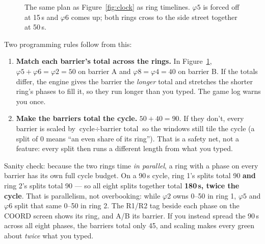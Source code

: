 \documentclass[11pt]{article}
\newcommand{\ph}[1]{\ensuremath{\varphi#1}}
\begin{document}
\begin{figure}[H]
\centering
{}
\caption{The same plan as Figure~\ref{fig:clock} as ring timelines. \ph{5} is
forced off at 15\,s and \ph{6} comes up; both rings cross to the side street
together at 50\,s.}
\label{fig:ringsplit}
\end{figure}

Two programming rules follow from this:

\begin{enumerate}[nosep]
  \item \textbf{Match each barrier's total across the rings.} In
        Figure~\ref{fig:ringsplit}, $\ph{5}+\ph{6} = \ph{2} = 50$ on barrier A
        and $\ph{8} = \ph{4} = 40$ on barrier B. If the totals differ, the engine
        gives the barrier the \emph{longer} total and stretches the shorter
        ring's phases to fill it, so they run longer than you typed. The game
        log warns you once.
  \item \textbf{Make the barriers total the cycle.} $50 + 40 = 90$. If they
        don't, every barrier is scaled by
        $\text{cycle} \div \text{barrier total}$ so the windows still tile the
        cycle (a split of 0 means ``an even share of its ring''). That is a
        safety net, not a feature: every split then runs a different length
        from what you typed.
\end{enumerate}

\begin{tipbox}
Sanity check: because the two rings time \emph{in parallel}, a ring with a phase
on every barrier has its own full cycle budget. On a 90\,s cycle, ring 1's splits
total 90 \textbf{and} ring 2's splits total 90 — so all eight splits together
total \textbf{180\,s, twice the cycle}. That is parallelism, not overbooking:
while \ph{2} owns 0--50 in ring 1, \ph{5} and \ph{6} split that same 0--50 in
ring 2. The R1/R2 tag beside each phase on the COORD screen shows its ring, and
A/B its barrier. If you instead spread the 90\,s across all eight phases, the
barriers total only 45, and scaling makes every green about \emph{twice} what
you typed.
\end{tipbox}
\end{document}
